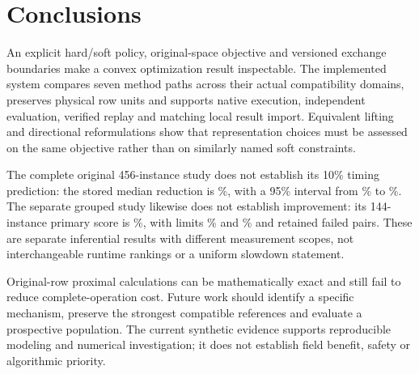 \section{Conclusions}\label{sec:conclusions}
An explicit hard/soft policy, original-space objective and versioned exchange
boundaries make a convex optimization result inspectable. The implemented
system compares seven method paths across their actual compatibility
domains, preserves physical row units and supports native execution,
independent evaluation, verified replay and matching local result import.
Equivalent lifting and directional reformulations show that representation
choices must be assessed on the same objective rather than on similarly
named soft constraints.

The complete original 456-instance study does not establish its 10\% timing
prediction: the stored median reduction is \OriginalEstimate\%, with a 95\%
interval from \OriginalLower\% to \OriginalUpper\%. The separate grouped
study likewise does not establish improvement: its 144-instance primary
score is \PrimaryEstimate\%, with limits \PrimaryLower\% and \PrimaryUpper\%
and \PrimaryFailed{} retained failed pairs. These are separate inferential
results with different measurement scopes, not interchangeable runtime
rankings or a uniform slowdown statement.

Original-row proximal calculations can be mathematically exact and still
fail to reduce complete-operation cost. Future work should identify a
specific mechanism, preserve the strongest compatible references and
evaluate a prospective population. The current synthetic evidence supports
reproducible modeling and numerical investigation; it does not establish
field benefit, safety or algorithmic priority.
